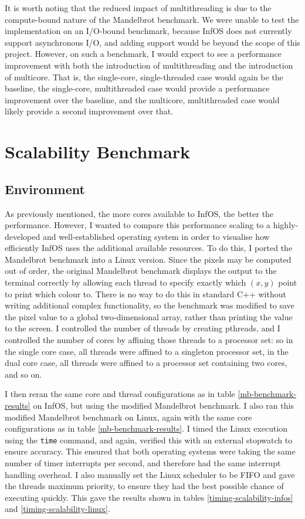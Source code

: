 \documentclass[bsc,frontabs,singlespacing,parskip,deptreport]{infthesis}
\begin{document}
It is worth noting that the reduced impact of multithreading is due to the compute-bound nature of the Mandelbrot benchmark. We were unable to test the implementation on an I/O-bound benchmark, because InfOS does not currently support asynchronous I/O, and adding support would be beyond the scope of this project. However, on such a benchmark, I would expect to see a performance improvement with both the introduction of multithreading and the introduction of multicore. That is, the single-core, single-threaded case would again be the baseline, the single-core, multithreaded case would provide a performance improvement over the baseline, and the multicore, multithreaded case would likely provide a second improvement over that.

\section{Scalability Benchmark}
\label{mb-mod-benchmark}
\subsection{Environment} 
As previously mentioned, the more cores available to InfOS, the better the performance. However, I wanted to compare this performance scaling to a highly-developed and well-established operating system in order to visualise how efficiently InfOS uses the additional available resources. To do this, I ported the Mandelbrot benchmark into a Linux version. Since the pixels may be computed out of order, the original Mandelbrot benchmark displays the output to the terminal correctly by allowing each thread to specify exactly which $(x,y)$ point to print which colour to. There is no way to do this in standard C++ without writing additional complex functionality, so the benchmark was modified to save the pixel value to a global two-dimensional array, rather than printing the value to the screen. I controlled the number of threads by creating pthreads, and I controlled the number of cores by affining those threads to a processor set: so in the single core case, all threads were affined to a singleton processor set, in the dual core case, all threads were affined to a processor set containing two cores, and so on.


I then reran the same core and thread configurations as in table \ref{mb-benchmark-results} on InfOS, but using the modified Mandelbrot benchmark. I also ran this modified Mandelbrot benchmark on Linux, again with the same core configurations as in table \ref{mb-benchmark-results}. I timed the Linux execution using the \verb|time| command, and again, verified this with an external stopwatch to ensure accuracy. This ensured that both operating systems were taking the same number of timer interrupts per second, and therefore had the same interrupt handling overhead. I also manually set the Linux scheduler to be FIFO and gave the threads maximum priority, to ensure they had the best possible chance of executing quickly. This gave the results shown in tables \ref{timing-scalability-infos} and \ref{timing-scalability-linux}.
\end{document}
